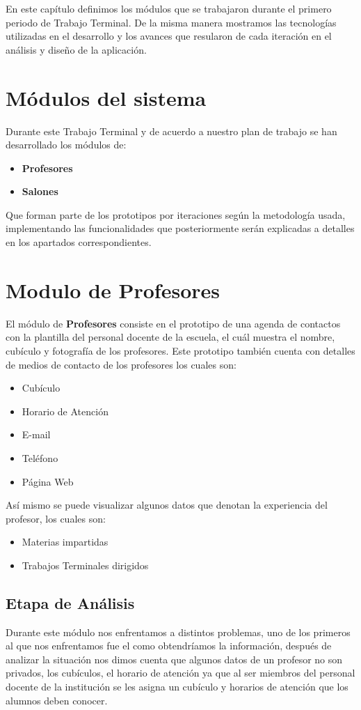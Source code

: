En este capítulo definimos los módulos que se trabajaron durante el primero periodo de Trabajo Terminal. De la misma manera mostramos las tecnologías utilizadas en el desarrollo y los avances que resularon de cada iteración en el análisis y diseño de la aplicación.

\section{Módulos del sistema}
	Durante este Trabajo Terminal y de acuerdo a nuestro plan de trabajo se han desarrollado los módulos de:
	\begin{itemize}
		\item \textbf{Profesores}
		\item \textbf{Salones}
	\end{itemize}
Que forman parte de los prototipos por iteraciones según la metodología usada, implementando las funcionalidades que posteriormente serán explicadas a detalles en los apartados correspondientes.
\section{Modulo de Profesores}	El módulo de \textbf{Profesores} consiste en el prototipo de una agenda de contactos con la plantilla del personal docente de la escuela, el cuál muestra el nombre, cubículo y fotografía de los profesores. Este prototipo también cuenta con detalles de medios de contacto de los profesores los cuales son:
	\begin{itemize}
		\item Cubículo
		\item Horario de Atención
		\item E-mail
		\item Teléfono
		\item Página Web
	\end{itemize}
	Así mismo se puede visualizar algunos datos que denotan la experiencia del profesor, los cuales son:
	\begin{itemize}
		\item Materias impartidas
		\item Trabajos Terminales dirigidos
	\end{itemize} 
	\subsection{Etapa de Análisis}
	Durante este módulo nos enfrentamos a distintos problemas, uno de los primeros al que nos enfrentamos fue el como obtendríamos la información, después de analizar la situación nos dimos cuenta que algunos datos de un profesor no son privados, los cubículos, el horario de atención ya que al ser miembros del personal docente de la institución se les asigna un cubículo y horarios de atención que los alumnos deben conocer. \\
	
